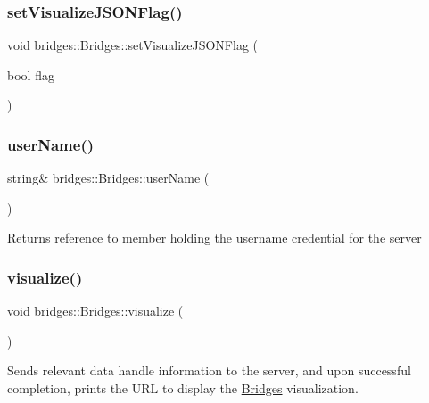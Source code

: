 \subsubsection{\texorpdfstring{set\+Visualize\+J\+S\+O\+N\+Flag()}{setVisualizeJSONFlag()}}
{\footnotesize\ttfamily void bridges\+::\+Bridges\+::set\+Visualize\+J\+S\+O\+N\+Flag (\begin{DoxyParamCaption}\item[{bool}]{flag }\end{DoxyParamCaption})}

\mbox{\label{namespacebridges_1_1_bridges_a98c0c6658b8eb9e8f20a7f3119cbd984}} 
\subsubsection{\texorpdfstring{user\+Name()}{userName()}}
{\footnotesize\ttfamily string\& bridges\+::\+Bridges\+::user\+Name (\begin{DoxyParamCaption}{ }\end{DoxyParamCaption})}

\begin{DoxyReturn}{Returns}
reference to member holding the username credential for the server 
\end{DoxyReturn}
\mbox{\label{namespacebridges_1_1_bridges_a2806e395134614cdd6327400b53d28ad}} 
\subsubsection{\texorpdfstring{visualize()}{visualize()}}
{\footnotesize\ttfamily void bridges\+::\+Bridges\+::visualize (\begin{DoxyParamCaption}{ }\end{DoxyParamCaption})}

Sends relevant data handle information to the server, and upon successful completion, prints the U\+RL to display the \mbox{\hyperlink{namespacebridges_1_1_bridges}{Bridges}} visualization. \mbox{\label{namespacebridges_1_1_bridges_a692124feb006d58c277db36c2e9342c8}} 
